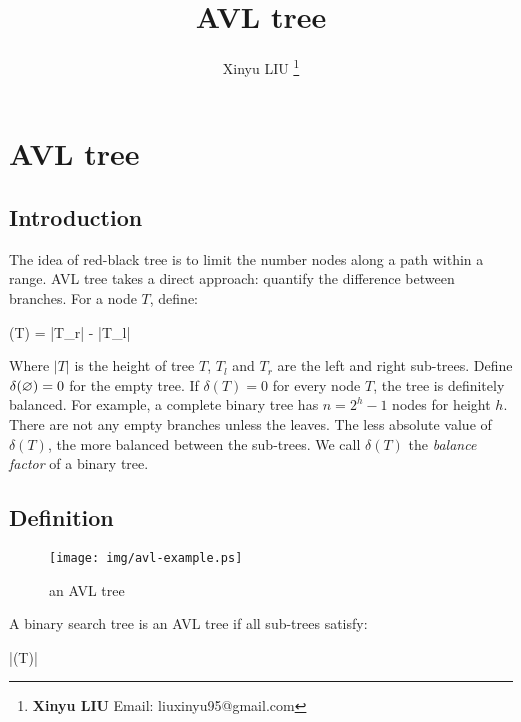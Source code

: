 \documentclass[b5paper]{article}
\begin{document}
\title{AVL tree}

\author{Xinyu LIU
\thanks{{\bfseries Xinyu LIU} \newline
  Email: liuxinyu95@gmail.com \newline}
  }

\maketitle
\fi


\ifx\wholebook\relax
\chapter{AVL tree}
\fi

\section{Introduction}
\label{introduction} 

The idea of red-black tree is to limit the number nodes along a path within a range. AVL tree takes a direct approach: quantify the difference between branches. For a node $T$, define:

\be
  \delta(T) = |T_r| - |T_l|
\ee

Where $|T|$ is the height of tree $T$, $T_l$ and $T_r$ are the left and right sub-trees. Define $\delta(\varnothing) = 0$ for the empty tree. If $\delta(T) = 0$ for every node $T$, the tree is definitely balanced. For example, a complete binary tree has $n=2^h - 1$ nodes for height $h$. There are not any empty branches unless the leaves. The less absolute value of $\delta(T)$, the more balanced between the sub-trees. We call $\delta(T)$ the {\em balance factor} of a binary tree.

\section{Definition}

\begin{figure}[htbp]
   \centering
   \texttt{[image: img/avl-example.ps]}
   \caption{an AVL tree}
   \label{fig:avl-example}
\end{figure}

A binary search tree is an AVL tree if all sub-trees satisfy:

\be
  |\delta(T)| 
\ee
\end{document}
